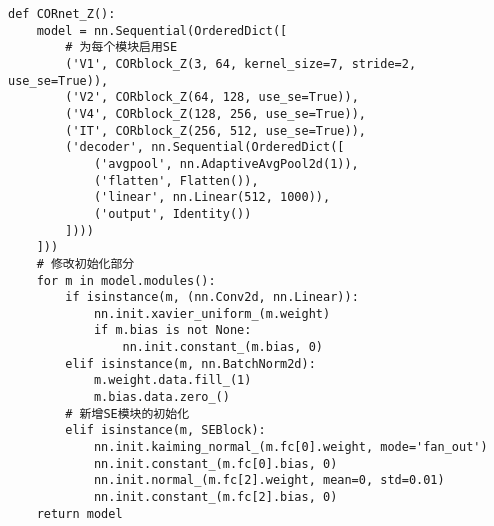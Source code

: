 \begin{lstlisting}
def CORnet_Z():
    model = nn.Sequential(OrderedDict([
    	# 为每个模块启用SE
    	('V1', CORblock_Z(3, 64, kernel_size=7, stride=2, use_se=True)),
    	('V2', CORblock_Z(64, 128, use_se=True)),
    	('V4', CORblock_Z(128, 256, use_se=True)),
    	('IT', CORblock_Z(256, 512, use_se=True)),
    	('decoder', nn.Sequential(OrderedDict([
            ('avgpool', nn.AdaptiveAvgPool2d(1)),
            ('flatten', Flatten()),
            ('linear', nn.Linear(512, 1000)),
            ('output', Identity())
    	])))
    ]))
    # 修改初始化部分
    for m in model.modules():
    	if isinstance(m, (nn.Conv2d, nn.Linear)):
            nn.init.xavier_uniform_(m.weight)
            if m.bias is not None:
                nn.init.constant_(m.bias, 0)
    	elif isinstance(m, nn.BatchNorm2d):
            m.weight.data.fill_(1)
            m.bias.data.zero_()
    	# 新增SE模块的初始化
    	elif isinstance(m, SEBlock):
            nn.init.kaiming_normal_(m.fc[0].weight, mode='fan_out')
            nn.init.constant_(m.fc[0].bias, 0)
            nn.init.normal_(m.fc[2].weight, mean=0, std=0.01)
            nn.init.constant_(m.fc[2].bias, 0)
    return model
\end{lstlisting}

